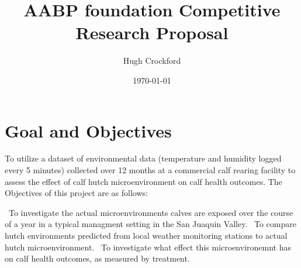 \documentclass[12pt]{article}
\title{AABP foundation Competitive Research Proposal}
\author{Hugh Crockford}
\date{\today}
\begin{document}
	\begin{abstract}
	
	\end{abstract}
	\section{Goal and Objectives}
	To utilize a dataset of environmental data (temperature and humidity logged every 5 minutes) collected over 12 months at a commercial calf rearing facility to assess the effect of calf hutch microenvironment on calf health outcomes.
	The Objectives of this project are as follows:
	\begin{itemize}
			\ To investigate the actual microenvironments calves are exposed over the course of a year in a typical managment setting in the San Juaquin Valley.
			\ To compare hutch environments predicted from local weather monitoring stations to actual hutch microenvironment.
			\ To investigate what effect this microenvironemnt has on calf health outcomes, as measured by treatment.
	
	 

\end{itemize}
\end{document}
